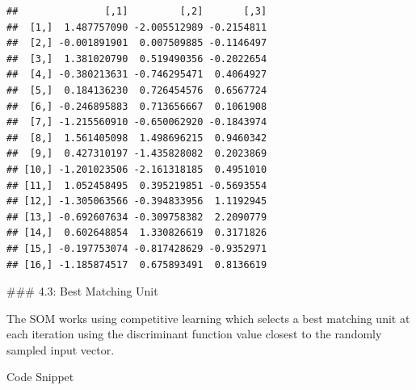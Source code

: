 \documentclass[
]{article}
\begin{document}
\begin{verbatim}
##               [,1]         [,2]       [,3]
##  [1,]  1.487757090 -2.005512989 -0.2154811
##  [2,] -0.001891901  0.007509885 -0.1146497
##  [3,]  1.381020790  0.519490356 -0.2022654
##  [4,] -0.380213631 -0.746295471  0.4064927
##  [5,]  0.184136230  0.726454576  0.6567724
##  [6,] -0.246895883  0.713656667  0.1061908
##  [7,] -1.215560910 -0.650062920 -0.1843974
##  [8,]  1.561405098  1.498696215  0.9460342
##  [9,]  0.427310197 -1.435828082  0.2023869
## [10,] -1.201023506 -2.161318185  0.4951010
## [11,]  1.052458495  0.395219851 -0.5693554
## [12,] -1.305063566 -0.394833956  1.1192945
## [13,] -0.692607634 -0.309758382  2.2090779
## [14,]  0.602648854  1.330826619  0.3171826
## [15,] -0.197753074 -0.817428629 -0.9352971
## [16,] -1.185874517  0.675893491  0.8136619
\end{verbatim}

\#\#\# 4.3: Best Matching Unit

The SOM works using competitive learning which selects a best matching
unit at each iteration using the discriminant function value closest to
the randomly sampled input vector.

Code Snippet
\end{document}
